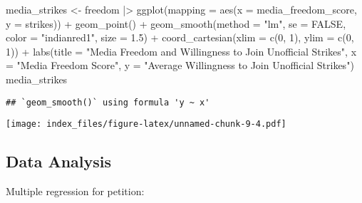 \documentclass[
]{article}
\newenvironment{Shaded}{\begin{snugshade}}{\end{snugshade}}
\newcommand{\AttributeTok}[1]{\textcolor[rgb]{0.77,0.63,0.00}{#1}}
\newcommand{\ConstantTok}[1]{\textcolor[rgb]{0.00,0.00,0.00}{#1}}
\newcommand{\DecValTok}[1]{\textcolor[rgb]{0.00,0.00,0.81}{#1}}
\newcommand{\FloatTok}[1]{\textcolor[rgb]{0.00,0.00,0.81}{#1}}
\newcommand{\FunctionTok}[1]{\textcolor[rgb]{0.00,0.00,0.00}{#1}}
\newcommand{\NormalTok}[1]{#1}
\newcommand{\OtherTok}[1]{\textcolor[rgb]{0.56,0.35,0.01}{#1}}
\newcommand{\SpecialCharTok}[1]{\textcolor[rgb]{0.00,0.00,0.00}{#1}}
\newcommand{\StringTok}[1]{\textcolor[rgb]{0.31,0.60,0.02}{#1}}
\begin{document}
\begin{Shaded}
\begin{Highlighting}[]
\NormalTok{media\_strikes }\OtherTok{\textless{}{-}}\NormalTok{ freedom }\SpecialCharTok{|\textgreater{}}
  \FunctionTok{ggplot}\NormalTok{(}\AttributeTok{mapping =} \FunctionTok{aes}\NormalTok{(}\AttributeTok{x =}\NormalTok{ media\_freedom\_score,}
         \AttributeTok{y =}\NormalTok{ strikes)) }\SpecialCharTok{+}
  \FunctionTok{geom\_point}\NormalTok{() }\SpecialCharTok{+} 
  \FunctionTok{geom\_smooth}\NormalTok{(}\AttributeTok{method =} \StringTok{"lm"}\NormalTok{, }\AttributeTok{se =} \ConstantTok{FALSE}\NormalTok{, }\AttributeTok{color =} \StringTok{"indianred1"}\NormalTok{, }\AttributeTok{size =} \FloatTok{1.5}\NormalTok{) }\SpecialCharTok{+}
  \FunctionTok{coord\_cartesian}\NormalTok{(}\AttributeTok{xlim =} \FunctionTok{c}\NormalTok{(}\DecValTok{0}\NormalTok{, }\DecValTok{1}\NormalTok{), }\AttributeTok{ylim =} \FunctionTok{c}\NormalTok{(}\DecValTok{0}\NormalTok{, }\DecValTok{1}\NormalTok{)) }\SpecialCharTok{+}
  \FunctionTok{labs}\NormalTok{(}\AttributeTok{title =} \StringTok{"Media Freedom and Willingness to Join Unofficial Strikes"}\NormalTok{,}
       \AttributeTok{x =} \StringTok{"Media Freedom Score"}\NormalTok{,}
       \AttributeTok{y =} \StringTok{"Average Willingness to Join Unofficial Strikes"}\NormalTok{)}
\NormalTok{media\_strikes}
\end{Highlighting}
\end{Shaded}

\begin{verbatim}
## `geom_smooth()` using formula 'y ~ x'
\end{verbatim}

\texttt{[image: index\_files/figure-latex/unnamed-chunk-9-4.pdf]}

\hypertarget{data-analysis}{%
\subsection{Data Analysis}\label{data-analysis}}

Multiple regression for petition:
\end{document}

